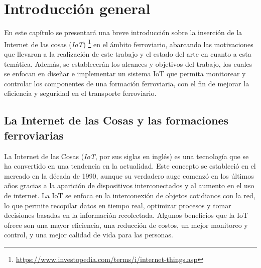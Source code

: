 
\chapter{Introducción general} %

\label{Chapter1} %
\label{IntroGeneral}


\newcommand{\keyword}[1]{\textbf{#1}}
\newcommand{\tabhead}[1]{\textbf{#1}}
\newcommand{\code}[1]{\texttt{#1}}
\newcommand{\file}[1]{\texttt{\bfseries#1}}
\newcommand{\option}[1]{\texttt{\itshape#1}}
\newcommand{\grados}{$^{\circ}$}



En este capítulo se presentará una breve introducción sobre la inserción de la Internet de las cosas (\textit{IoT}) \footnote{\url{https://www.investopedia.com/terms/i/internet-things.asp}} en el ámbito ferroviario, abarcando las motivaciones que llevaron a la realización de este trabajo y el estado del arte en cuanto a esta temática. Además, se establecerán los alcances y objetivos del trabajo, los cuales se enfocan en diseñar e implementar un sistema IoT que permita monitorear y controlar los componentes de una formación ferroviaria, con el fin de mejorar la eficiencia y seguridad en el transporte ferroviario.



\section{La Internet de las Cosas y las formaciones ferroviarias}

La Internet de las Cosas (\textit{IoT}, por sus siglas en inglés) es una tecnología que se ha convertido en una tendencia en la actualidad. Este concepto se estableció en el mercado en la década de 1990, aunque su verdadero auge comenzó en los últimos años gracias a la aparición de dispositivos interconectados y al aumento en el uso de internet. La IoT se enfoca en la interconexión de objetos cotidianos con la red, lo que permite recopilar datos en tiempo real, optimizar procesos y tomar decisiones basadas en la información recolectada. Algunos beneficios que la IoT ofrece son una mayor eficiencia, una reducción de costos, un mejor monitoreo y control, y una mejor calidad de vida para las personas.

